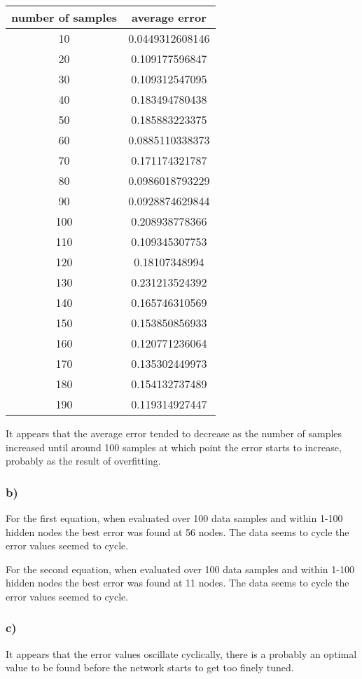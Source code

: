 \documentclass[12pt,a4paper]{article}
\begin{document}
\begin{tabular}{|c|c|}
\hline
\textbf{number of samples} & \textbf{average error}\\
\hline
	10 & 0.0449312608146\\
	\hline
	20 & 0.109177596847\\
	\hline
	30 & 0.109312547095\\
	\hline
	40 & 0.183494780438\\
	\hline
	50 & 0.185883223375\\
	\hline
	60 & 0.0885110338373\\
	\hline
	70 & 0.171174321787\\
	\hline
	80 & 0.0986018793229\\
	\hline
	90 & 0.0928874629844\\
	\hline
	100 & 0.208938778366\\
	\hline
	110 & 0.109345307753\\
	\hline
	120 & 0.18107348994\\
	\hline
	130 & 0.231213524392\\
	\hline
	140 & 0.165746310569\\
	\hline
	150 & 0.153850856933\\
	\hline
	160 & 0.120771236064\\
	\hline
	170 & 0.135302449973\\
	\hline
	180 & 0.154132737489\\
	\hline
	190 & 0.119314927447\\
	\hline
\end{tabular}

It appears that the average error tended to decrease as the number of samples increased until around 100 samples at which point the error starts to increase, probably as the result of overfitting.

\subsubsection*{b)}
\label{ssub:b_}
For the first equation, when evaluated over 100 data samples and within 1-100 hidden nodes the best error was found at 56 nodes. The data seems to cycle the error values seemed to cycle.

For the second equation, when evaluated over 100 data samples and within 1-100 hidden nodes the best error was found at 11 nodes. The data seems to cycle the error values seemed to cycle.

\subsubsection*{c)}
\label{ssub:c_}
It appears that the error values oscillate cyclically, there is a probably an optimal value to be found before the network starts to get too finely tuned.
\end{document}
